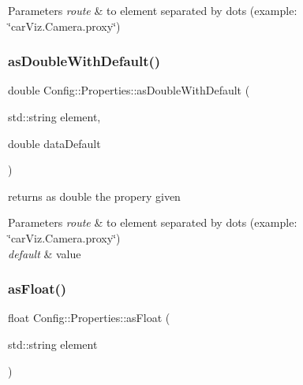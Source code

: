 \begin{DoxyParams}{Parameters}
{\em route} & to element separated by dots (example\+: \char`\"{}car\+Viz.\+Camera.\+proxy\char`\"{}) \\
\hline
\end{DoxyParams}
\mbox{\label{class_config_1_1_properties_ac482a248dab5d785c38a883ad6053062}} 
\subsubsection{\texorpdfstring{as\+Double\+With\+Default()}{asDoubleWithDefault()}}
{\footnotesize\ttfamily double Config\+::\+Properties\+::as\+Double\+With\+Default (\begin{DoxyParamCaption}\item[{std\+::string}]{element,  }\item[{double}]{data\+Default }\end{DoxyParamCaption})}



returns as double the propery given 


\begin{DoxyParams}{Parameters}
{\em route} & to element separated by dots (example\+: \char`\"{}car\+Viz.\+Camera.\+proxy\char`\"{}) \\
\hline
{\em default} & value \\
\hline
\end{DoxyParams}
\mbox{\label{class_config_1_1_properties_a82dc1305eac3b4e68d776b868d03c599}} 
\subsubsection{\texorpdfstring{as\+Float()}{asFloat()}}
{\footnotesize\ttfamily float Config\+::\+Properties\+::as\+Float (\begin{DoxyParamCaption}\item[{std\+::string}]{element }\end{DoxyParamCaption})}



